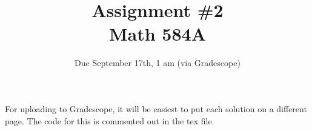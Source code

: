 \documentclass[11pt,letterpaper]{article}
\title{Assignment \#2\\Math 584A}
\author{
	}
\date{Due September 17th, 1 am (via Gradescope)}
\newenvironment{prob}[1]
  {\renewcommand\theinnerprob{#1}\innerprob}
  {\endinnerprob}
\begin{document}
\maketitle

For uploading to Gradescope, it will be easiest to put each solution on a different page.  The code for this is commented out in the tex file.





\end{document}
